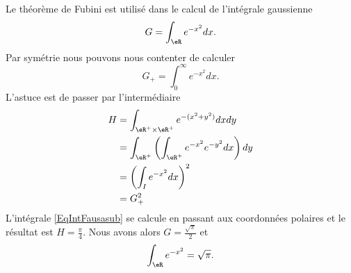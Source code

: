 \begin{example} \label{ExrgMIni}
    Le théorème de Fubini est utilisé dans le calcul de l'intégrale gaussienne
    \begin{equation}
        G=\int_{\eR} e^{-x^2}dx.
    \end{equation}
    Par symétrie nous pouvons nous contenter de calculer
    \begin{equation}
        G_+=\int_0^{\infty} e^{-x^2}dx.
    \end{equation}
    L'astuce est de passer par l'intermédiaire
    \begin{subequations}
        \begin{align}
            H&=\int_{\eR^+\times\eR^+} e^{-(x^2+y^2)}dxdy       \label{EqIntFausasub}\\
            &=\int_{\eR^+}\left( \int_{\eR^+} e^{-x^2} e^{-y^2}dx \right)dy\\
            &=\left( \int_I e^{-x^2} dx\right)^2\\
            &=G_+^2
        \end{align}
    \end{subequations}
    L'intégrale \eqref{EqIntFausasub} se calcule en passant aux coordonnées polaires et le résultat est \( H=\frac{ \pi }{ 4 }\). Nous avons alors \( G=\frac{ \sqrt{\pi} }{ 2 }\) et
    \begin{equation}
        \int_{\eR} e^{-x^2}=\sqrt{\pi}.
    \end{equation}
\end{example}


